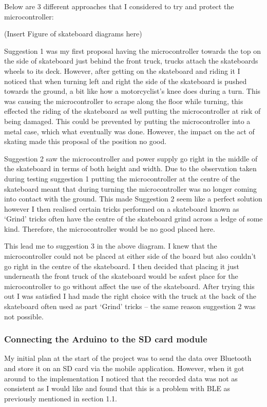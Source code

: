 Below are 3 different approaches that I considered to try and protect the microcontroller:

(Insert Figure of skateboard diagrams here)

Suggestion 1 was my first proposal having the microcontroller towards the top on the side of skateboard just behind the front truck, trucks attach the skateboards wheels to its deck. However, after getting on the skateboard and riding it I noticed that when turning left and right the side of the skateboard is pushed towards the ground, a bit like how a motorcyclist’s knee does during a turn. This was causing the microcontroller to scrape along the floor while turning, this effected the riding of the skateboard as well putting the microcontroller at risk of being damaged. This could be prevented by putting the microcontroller into a metal case, which what eventually was done. However, the impact on the act of skating made this proposal of the position no good.

Suggestion 2 saw the microcontroller and power supply go right in the middle of the skateboard in terms of both height and width. Due to the observation taken during testing suggestion 1 putting the microcontroller at the centre of the skateboard meant that during turning the microcontroller was no longer coming into contact with the ground. This made Suggestion 2 seem like a perfect solution however I then realised certain tricks performed on a skateboard known as ‘Grind’ tricks often have the centre of the skateboard grind across a ledge of some kind. Therefore, the microcontroller would be no good placed here. 

This lead me to suggestion 3 in the above diagram. I knew that the microcontroller could not be placed at either side of the board but also couldn’t go right in the centre of the skateboard. I then decided that placing it just underneath the front truck of the skateboard would be safest place for the microcontroller to go without affect the use of the skateboard. After trying this out I was satisfied I had made the right choice with the truck at the back of the skateboard often used as part ‘Grind’ tricks – the same reason suggestion 2 was not possible.


\subsubsection{Connecting the Arduino to the SD card module}\label{arduinoandsdcard}

My initial plan at the start of the project was to send the data over Bluetooth and store it on an SD card via the mobile application. However, when it got around to the implementation I noticed that the recorded data was not as consistent as I would like and found that this is a problem with BLE as previously mentioned in section 1.1. 

